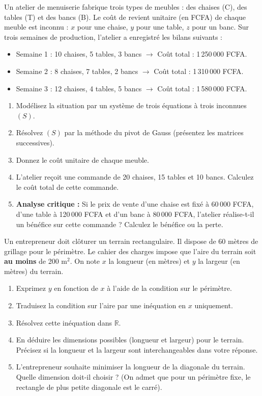 \documentclass[11pt]{article}
\begin{document}
\begin{exercice}
\label{exo:atelier}
Un atelier de menuiserie fabrique trois types de meubles : des chaises (C), des tables (T) et des bancs (B).
Le coût de revient unitaire (en FCFA) de chaque meuble est inconnu : $x$ pour une chaise, $y$ pour une table, $z$ pour un banc.
Sur trois semaines de production, l'atelier a enregistré les bilans suivants :
\begin{itemize}
\item Semaine 1 : 10 chaises, 5 tables, 3 bancs $\rightarrow$ Coût total : 1\,250\,000 FCFA.
\item Semaine 2 : 8 chaises, 7 tables, 2 bancs $\rightarrow$ Coût total : 1\,310\,000 FCFA.
\item Semaine 3 : 12 chaises, 4 tables, 5 bancs $\rightarrow$ Coût total : 1\,580\,000 FCFA.
\end{itemize}
\begin{enumerate}
\item Modélisez la situation par un système de trois équations à trois inconnues $(S)$.
\item Résolvez $(S)$ par la méthode du pivot de Gauss (présentez les matrices successives).
\item Donnez le coût unitaire de chaque meuble.
\item L'atelier reçoit une commande de 20 chaises, 15 tables et 10 bancs. Calculez le coût total de cette commande.
\item \textbf{Analyse critique :} Si le prix de vente d'une chaise est fixé à 60\,000 FCFA, d'une table à 120\,000 FCFA et d'un banc à 80\,000 FCFA, l'atelier réalise-t-il un bénéfice sur cette commande ? Calculez le bénéfice ou la perte.
\end{enumerate}
\end{exercice}

\begin{exercice}
\label{exo:terrain}
Un entrepreneur doit clôturer un terrain rectangulaire. Il dispose de 60 mètres de grillage pour le périmètre. Le cahier des charges impose que l'aire du terrain soit \textbf{au moins} de 200 m$^2$.
On note $x$ la longueur (en mètres) et $y$ la largeur (en mètres) du terrain.
\begin{enumerate}
\item Exprimez $y$ en fonction de $x$ à l'aide de la condition sur le périmètre.
\item Traduisez la condition sur l'aire par une inéquation en $x$ uniquement.
\item Résolvez cette inéquation dans $\mathbb{R}$.
\item En déduire les dimensions possibles (longueur et largeur) pour le terrain. Précisez si la longueur et la largeur sont interchangeables dans votre réponse.
\item L'entrepreneur souhaite minimiser la longueur de la diagonale du terrain. Quelle dimension doit-il choisir ? (On admet que pour un périmètre fixe, le rectangle de plus petite diagonale est le carré).
\end{enumerate}
\end{exercice}
\end{document}

